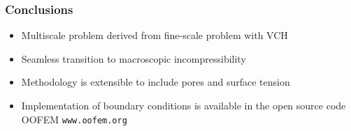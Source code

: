 \documentclass[11pt]{beamer} %
\begin{document}
\begin{frame}
 \frametitle{Conclusions}
 \begin{itemize}
 \item Multiscale problem derived from fine-scale problem with VCH
 \item Seamless transition to macroscopic incompressibility
 \item Methodology is extensible to include pores and surface tension
 \item Implementation of boundary conditions is available in the open source code OOFEM \texttt{www.oofem.org}
 \end{itemize}
\end{frame}
\end{document}
